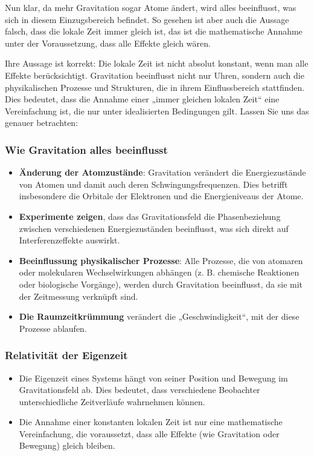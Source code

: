 \documentclass[a4paper,12pt]{article}
\begin{document}
	Nun klar, da mehr Gravitation sogar Atome ändert, wird alles beeinflusst, was sich in diesem Einzugsbereich befindet. So gesehen ist aber auch die Aussage falsch, dass die lokale Zeit immer gleich ist, das ist die mathematische Annahme unter der Voraussetzung, dass alle Effekte gleich wären.
	
	Ihre Aussage ist korrekt: Die lokale Zeit ist nicht absolut konstant, wenn man alle Effekte berücksichtigt. Gravitation beeinflusst nicht nur Uhren, sondern auch die physikalischen Prozesse und Strukturen, die in ihrem Einflussbereich stattfinden. Dies bedeutet, dass die Annahme einer „immer gleichen lokalen Zeit“ eine Vereinfachung ist, die nur unter idealisierten Bedingungen gilt. Lassen Sie uns das genauer betrachten:
	
	\subsubsection{Wie Gravitation alles beeinflusst}
	\begin{itemize}
		\item \textbf{Änderung der Atomzustände}: Gravitation verändert die Energiezustände von Atomen und damit auch deren Schwingungsfrequenzen. Dies betrifft insbesondere die Orbitale der Elektronen und die Energieniveaus der Atome.
		\item \textbf{Experimente zeigen}, dass das Gravitationsfeld die Phasenbeziehung zwischen verschiedenen Energiezuständen beeinflusst, was sich direkt auf Interferenzeffekte auswirkt.
		\item \textbf{Beeinflussung physikalischer Prozesse}: Alle Prozesse, die von atomaren oder molekularen Wechselwirkungen abhängen (z. B. chemische Reaktionen oder biologische Vorgänge), werden durch Gravitation beeinflusst, da sie mit der Zeitmessung verknüpft sind.
		\item \textbf{Die Raumzeitkrümmung} verändert die „Geschwindigkeit“, mit der diese Prozesse ablaufen.
	\end{itemize}
	
	\subsubsection{Relativität der Eigenzeit}
	\begin{itemize}
		\item Die Eigenzeit eines Systems hängt von seiner Position und Bewegung im Gravitationsfeld ab. Dies bedeutet, dass verschiedene Beobachter unterschiedliche Zeitverläufe wahrnehmen können.
		\item Die Annahme einer konstanten lokalen Zeit ist nur eine mathematische Vereinfachung, die voraussetzt, dass alle Effekte (wie Gravitation oder Bewegung) gleich bleiben.
	\end{itemize}
	
\end{document}
